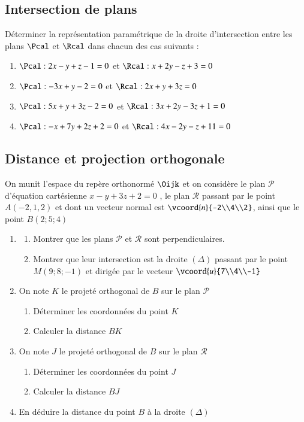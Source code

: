 \documentclass[oneside,12pt]{article}          %
\begin{document}
\subsection{Intersection de plans}
Déterminer la représentation paramétrique de la droite d'intersection entre les plans $\Pcal$ et $\Rcal$ dans chacun des cas suivants :
\begin{enumerate}
	\item $\Pcal:2x-y+z-1=0$ \quad et \quad $\Rcal:x+2y-z+3=0$
	\item $\Pcal:-3x+y-2=0$ \quad et \quad $\Rcal:2x+y+3z=0$
	\item $\Pcal:5x+y+3z-2=0$ \quad et \quad $\Rcal:3x+2y-3z+1=0$
	\item $\Pcal:-x+7y+2z+2=0$ \quad et \quad $\Rcal:4x-2y-z+11=0$
\end{enumerate}



\subsection{Distance et projection orthogonale}
On munit l'espace du repère orthonormé $\Oijk$ et on considère le plan $\mathscr{P}$ d'équation cartésienne $x-y+3z+2=0$ , le plan $\mathscr{R}$ passant par le point $A(-2,1,2)$ et dont un vecteur normal est $\vcoord{n}{-2\\4\\2}$,  ainsi que le point $B(2;5;4)$
\begin{enumerate}
    \item \begin{enumerate}
        \item Montrer que les plans $\mathscr{P}$ et $\mathscr{R}$ sont perpendiculaires.
        \item Montrer que leur intersection est la droite $(\Delta)$ passant par le point $M(9;8;-1)$ et dirigée par le vecteur $\vcoord{u}{7\\4\\-1}$
    \end{enumerate}
    \item On note $K$ le projeté orthogonal de $B$ sur le plan $\mathscr{P}$
    \begin{enumerate}
        \item Déterminer les coordonnées du point $K$
        \item Calculer la distance $BK$
    \end{enumerate}
    \item On note $J$ le projeté orthogonal de $B$ sur le plan $\mathscr{R}$
    \begin{enumerate}
        \item Déterminer les coordonnées du point $J$
        \item Calculer la distance $BJ$
    \end{enumerate}
    \item En déduire la distance du point $B$ à la droite $(\Delta)$
\end{enumerate}
\end{document}
